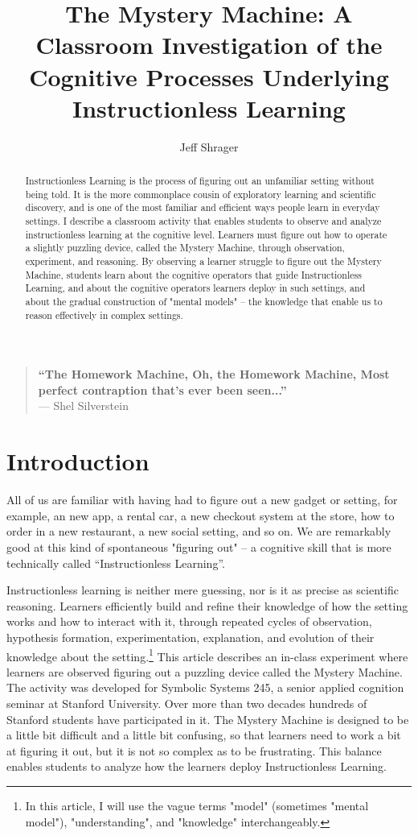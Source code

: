 \documentclass[12pt,letterpaper]{article}
\title{The Mystery Machine: A Classroom Investigation of the Cognitive Processes Underlying Instructionless Learning}
\author{Jeff Shrager}
\date{}
\begin{document}
\maketitle

\begin{quote}
\textbf{``The Homework Machine, Oh, the Homework Machine, Most perfect contraption that's ever been seen...''} \\
--- Shel Silverstein
\end{quote}

\begin{abstract}
Instructionless Learning is the process of figuring out an unfamiliar setting without being told. It is the more commonplace cousin of exploratory learning and scientific discovery, and is one of the most familiar and efficient ways people learn in everyday settings. I describe a classroom activity that enables students to observe and analyze instructionless learning at the cognitive level. Learners must figure out how to operate a slightly puzzling device, called the Mystery Machine, through observation, experiment, and reasoning. By observing a learner struggle to figure out the Mystery Machine, students learn about the cognitive operators that guide Instructionless Learning, and about the cognitive operators learners deploy in such settings, and about the gradual construction of "mental models" -- the knowledge that enable us to reason effectively in complex settings.
\end{abstract}

\section{Introduction}

All of us are familiar with having had to figure out a new gadget or setting, for example, an new app, a rental car, a new checkout system at the store, how to order in a new restaurant, a new social setting, and so on. We are remarkably good at this kind of spontaneous "figuring out" -- a cognitive skill that is more technically called ``Instructionless Learning''\cite{shrager1986instructionless}. 

Instructionless learning is neither mere guessing, nor is it as precise as scientific reasoning. Learners efficiently build and refine their knowledge of how the setting works and how to interact with it, through repeated cycles of observation, hypothesis formation, experimentation, explanation, and evolution of their knowledge about the setting.\footnote{In this article, I will use the vague terms "model" (sometimes "mental model"), "understanding", and "knowledge" interchangeably.} This article describes an in-class experiment where learners are observed figuring out a puzzling device called the Mystery Machine. The activity was developed for Symbolic Systems 245, a senior applied cognition seminar at Stanford University. Over more than two decades hundreds of Stanford students have participated in it. The Mystery Machine is designed to be a little bit difficult and a little bit confusing, so that learners need to work a bit at figuring it out, but it is not so complex as to be frustrating. This balance enables students to analyze how the learners deploy Instructionless Learning.
\end{document}
